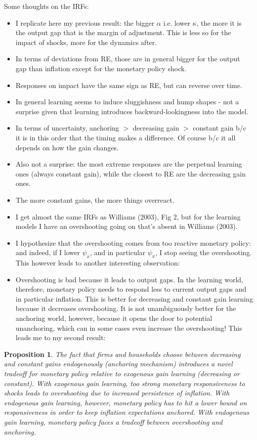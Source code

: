 \documentclass[11pt]{article}
\renewcommand{\[}{\begin{equation}}
\renewcommand{\]}{\end{equation}}
\newtheorem{prop}{Proposition}
\begin{document}
Some thoughts on the IRFs:
\begin{itemize}
\item I replicate here my previous result: the bigger $\alpha$ i.e. lower $\kappa$, the more it is the output gap that is the margin of adjustment. This is less so for the impact of shocks, more for the dynamics after. 
\item In terms of deviations from RE, those are in general bigger for the output gap than inflation except for the monetary policy shock.
\item Responses on impact have the same sign as RE, but can reverse over time. 
\item In general learning seems to induce sluggishness and hump shapes - not a surprise given that learning introduces backward-lookingness into the model.
\item In terms of uncertainty, anchoring $>$ decreasing gain $>$ constant gain b/c it is in this order that the timing makes a difference. Of course b/c it all depends on how the gain changes.
\item Also not a surprise: the most extreme responses are the perpetual learning ones (always constant gain), while the closest to RE are the decreasing gain ones. 
\item The more constant gains, the more things overreact.
\item I get almost the same IRFs as Williams (2003), Fig 2, but for the learning models I have an overshooting going on that's absent in Williams (2003).
\item I hypothesize that the overshooting comes from too reactive monetary policy: and indeed, if I lower $\psi_{x}$, and in particular $\psi_{\pi}$, I stop seeing the overshooting. This however leads to another interesting observation:
\item Overshooting is bad because it leads to output gaps. In the learning world, therefore, monetary policy needs to respond less to current output gaps and in particular inflation. This is better for decreasing and constant gain learning because it decreases overshooting. It is not unambiguously better for the anchoring world, however, because it opens the door to potential unanchoring, which can in some cases even increase the overshooting! This leads me to my second result:
\end{itemize}

	\begin{prop} The fact that firms and households choose between decreasing and constant gains endogenously (anchoring mechanism) introduces a novel tradeoff for monetary policy relative to exogenous gain learning (decreasing or constant). With exogenous gain learning, too strong monetary responsiveness to shocks leads to overshooting due to increased persistence of inflation. With endogenous gain learning, however, monetary policy has to hit a lower bound on responsiveness in order to keep inflation expectations anchored. With endogenous gain learning, monetary policy faces a tradeoff between overshooting and anchoring. 
	\end{prop}
\end{document}
